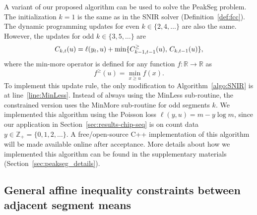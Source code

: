 \documentclass{article}
\newcommand{\ZZ}{\mathbb Z}
\newcommand{\RR}{\mathbb R}
\begin{document}
A variant of our proposed algorithm can be used to solve the PeakSeg
problem. The initialization $k=1$ is the same as in the SNIR solver
(Definition~\ref{def:fcc}). The dynamic programming updates for even
$k\in\{2, 4, \dots\}$ are also the same. However, the updates for odd
$k\in\{3, 5, \dots\}$ are
\begin{equation}
  C_{k,t}(u) = \ell(y_t, u) + \min\{
  C_{k-1,t-1}^\geq(u),\, C_{k,t-1}(u)
  \},
\end{equation}
where the min-more operator is defined for any function $f:\RR\rightarrow\RR$ as
\begin{equation}
  \label{eq:min-more-def}
  f^\geq(u) = \min_{x\geq u} f(x).
\end{equation}
To implement this update rule, the only modification to
Algorithm~\ref{algo:SNIR} is at line~\ref{line:MinLess}. Instead of
always using the MinLess sub-routine, the constrained version uses the
MinMore sub-routine for odd segments $k$. We implemented this algorithm
using the Poisson loss $\ell(y, u) = m - y\log m$, since our
application in Section~\ref{sec:results-chip-seq} is on count data
$y\in\ZZ_+ = \{0, 1, 2, \dots\}$. 
A free/open-source C++ implementation of this algorithm will be made
available online after acceptance.  More details about how we
implemented this algorithm can be found in the supplementary materials
(Section~\ref{sec:peakseg_details}).

\subsection{General affine inequality constraints
  between adjacent segment means}



\end{document}
